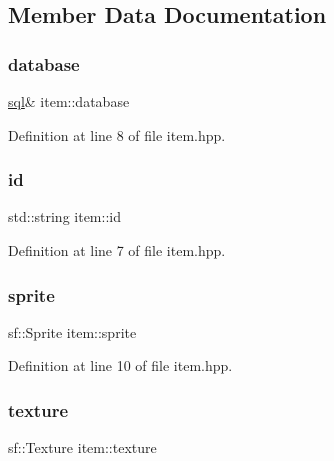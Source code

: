 \subsection{Member Data Documentation}
\mbox{\label{classitem_a0a822c97c7e59706475fc5e541926df3}} 
\subsubsection{\texorpdfstring{database}{database}}
{\footnotesize\ttfamily \hyperlink{classsql}{sql}\& item\+::database\hspace{0.3cm}{\ttfamily [private]}}



Definition at line 8 of file item.\+hpp.

\mbox{\label{classitem_af512775a194b958ca9630d59ed0daf27}} 
\subsubsection{\texorpdfstring{id}{id}}
{\footnotesize\ttfamily std\+::string item\+::id\hspace{0.3cm}{\ttfamily [private]}}



Definition at line 7 of file item.\+hpp.

\mbox{\label{classitem_adb991244770ef45558a35510f38ffb04}} 
\subsubsection{\texorpdfstring{sprite}{sprite}}
{\footnotesize\ttfamily sf\+::\+Sprite item\+::sprite\hspace{0.3cm}{\ttfamily [private]}}



Definition at line 10 of file item.\+hpp.

\mbox{\label{classitem_af2fe0df797bc29b4b907e03823df5c3c}} 
\subsubsection{\texorpdfstring{texture}{texture}}
{\footnotesize\ttfamily sf\+::\+Texture item\+::texture\hspace{0.3cm}{\ttfamily [private]}}



